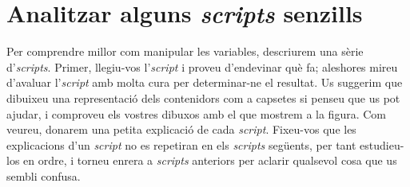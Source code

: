 \section{Analitzar alguns \emph{scripts} senzills}
Per comprendre millor com manipular les variables, descriurem una sèrie d'\emph{scripts}. Primer, llegiu-vos l'\emph{script} i proveu d'endevinar què fa; aleshores mireu d'avaluar l'\emph{script} amb molta cura per determinar-ne el resultat. Us suggerim que dibuixeu una representació dels contenidors com a capsetes si penseu que us pot ajudar, i comproveu els vostres dibuxos amb el que mostrem a la figura. Com veureu, donarem una petita explicació de cada \emph{script}. Fixeu-vos que les explicacions d'un \emph{script} no es repetiran en els \emph{scripts}
següents, per tant estudieu-los en ordre, i torneu enrera a \emph{scripts} anteriors per aclarir qualsevol cosa que us sembli confusa. 

